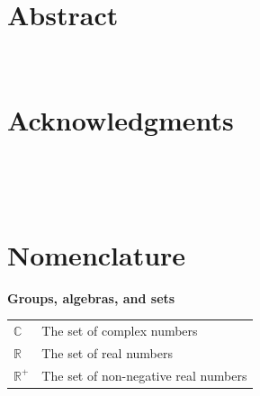 \documentclass[11pt]{report}
\numberwithin{equation}{chapter}		%
\numberwithin{figure}{chapter}			%
\numberwithin{table}{chapter}			%
\newcommand{\R}{\mathbb{R}}                         %
\newcommand{\C}{\mathbb{C}}                         %
\begin{document}
\thispagestyle{empty} \ \newpage								%

\chapter*{Abstract}
\lipsum[3-6]

\newpage
\thispagestyle{empty} \ \newpage								%

\chapter*{Acknowledgments}
\lipsum[3-6]

\newpage
\thispagestyle{empty} \ \newpage								%

\tableofcontents\newpage 		 								%
\thispagestyle{empty} \ \newpage								%


\chapter*{Nomenclature}
\thispagestyle{empty}

\textbf{Groups, algebras, and sets}\\[3mm]
\begin{tabularx}{\textwidth}{p{2.5cm}X}
	$\C$            & The set of complex numbers                        \\
	$\R$            & The set of real numbers                           \\
	$\R^+$          & The set of non-negative real numbers      
\end{tabularx}\\
\end{document}
